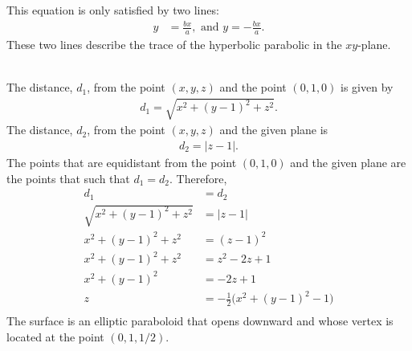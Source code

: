 This equation is only satisfied by two lines: 
\begin{align*}
  y&= \frac{bx}{a}, \text{ and } y=-\frac{bx}{a}. 
\end{align*}
These two lines describe the trace of the hyperbolic parabolic in the $xy$-plane.
\item 
{}\\
The distance, $d_1$, from the point $(x,y,z)$ and the point $(0,1,0)$ is given by 
\begin{align*}
  d_1 = \sqrt{x^2 + (y-1)^2 + z^2}.
\end{align*}
The distance, $d_2$, from the point $(x,y,z)$ and the given plane is  
\begin{align*}
  d_2 = \big| z - 1 \big|.
\end{align*}
The points that are equidistant from the point $(0,1,0)$ and the given plane are the points that such that $d_1 = d_2$. Therefore, 
\begin{align*}
  d_1 &= d_2 \\
   \sqrt{x^2 + (y-1)^2 + z^2} &=  \big| z - 1 \big| \\
   x^2 + (y-1)^2 + z^2 &=  ( z - 1)^2 \\   
   x^2 + (y-1)^2 + z^2 &=  z^2 - 2z + 1 \\   
   x^2 + (y-1)^2  &= - 2z + 1 \\   
   z&=- \frac{1}{2} \Big(x^2 + (y-1)^2 - 1\Big)  \\   
\end{align*}
The surface is an elliptic paraboloid that opens downward and whose vertex is located at the point $(0,1,1/2)$. 

\EEN
